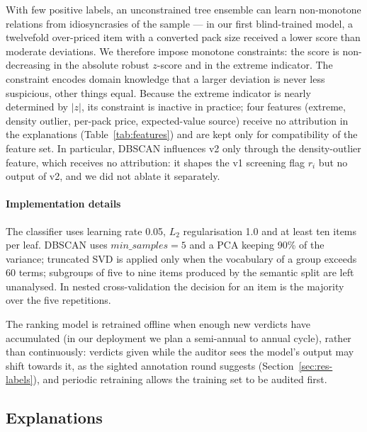 \documentclass[conference]{IEEEtran}
\begin{document}
With few positive labels, an unconstrained tree ensemble can learn non-monotone relations from
idiosyncrasies of the sample --- in our first blind-trained model, a twelvefold over-priced item with a
converted pack size received a lower score than moderate deviations. We therefore impose monotone
constraints: the score is non-decreasing in the absolute robust $z$-score and in the extreme indicator. The
constraint encodes domain knowledge that a larger deviation is never less suspicious, other things equal.
Because the extreme indicator is nearly determined by $|z|$, its constraint is inactive in practice; four
features (extreme, density outlier, per-pack price, expected-value source) receive no attribution in the
explanations (Table~\ref{tab:features}) and are kept only for compatibility of the feature set. In
particular, DBSCAN influences v2 only through the density-outlier feature, which receives no attribution:
it shapes the v1 screening flag $r_i$ but no output of v2, and we did not ablate it separately.

\paragraph{Implementation details} The classifier uses learning rate 0.05, $L_2$ regularisation 1.0 and at
least ten items per leaf. DBSCAN uses $\textit{min\_samples}=5$ and a PCA keeping 90\% of the variance;
truncated SVD is applied only when the vocabulary of a group exceeds 60 terms; subgroups of five to nine
items produced by the semantic split are left unanalysed. In nested cross-validation the decision for an
item is the majority over the five repetitions.

The ranking model is retrained offline when enough new verdicts have accumulated (in our deployment we plan a
semi-annual to annual cycle), rather than continuously: verdicts given while the auditor sees the model's
output may shift towards it, as the sighted annotation round suggests (Section~\ref{sec:res-labels}), and
periodic retraining allows the training set to be audited first.

\subsection{Explanations}
\end{document}
